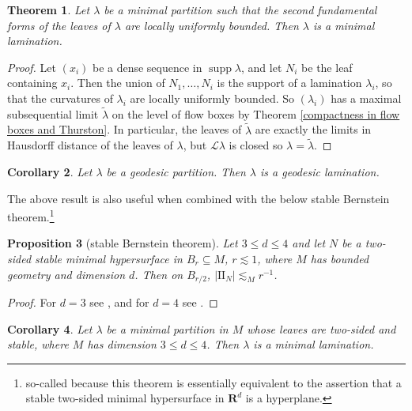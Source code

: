 \documentclass[reqno,11pt]{amsart}
\newcommand{\RR}{\mathbf{R}}
\DeclareMathOperator{\supp}{supp}
\newcommand{\Leaves}{\mathscr L}
\newcommand{\Two}{\mathrm{I\!I}}
\newtheorem{theorem}{Theorem}[section]
\newtheorem{proposition}[theorem]{Proposition}
\newtheorem{corollary}[theorem]{Corollary}
\theoremstyle{definition}
\numberwithin{equation}{section}
\begin{document}
\begin{theorem}\label{partition implies lamination}
Let $\lambda$ be a minimal partition such that the second fundamental forms of the leaves of $\lambda$ are locally uniformly bounded.
Then $\lambda$ is a minimal lamination.
\end{theorem}
\begin{proof}
Let $(x_i)$ be a dense sequence in $\supp \lambda$, and let $N_i$ be the leaf containing $x_i$.
Then the union of $N_1, \dots, N_i$ is the support of a lamination $\lambda_i$, so that the curvatures of $\lambda_i$ are locally uniformly bounded.
So $(\lambda_i)$ has a maximal subsequential limit $\tilde \lambda$ on the level of flow boxes by Theorem \ref{compactness in flow boxes and Thurston}.
In particular, the leaves of $\tilde \lambda$ are exactly the limits in Hausdorff distance of the leaves of $\lambda$, but $\Leaves \lambda$ is closed so $\lambda = \tilde \lambda$.
\end{proof}

\begin{corollary}
Let $\lambda$ be a geodesic partition. Then $\lambda$ is a geodesic lamination.
\end{corollary}

The above result is also useful when combined with the below stable Bernstein theorem.\footnote{so-called because this theorem is essentially equivalent to the assertion that a stable two-sided minimal hypersurface in $\RR^d$ is a hyperplane.}

\begin{proposition}[stable Bernstein theorem]
Let $3 \leq d \leq 4$ and let $N$ be a two-sided stable minimal hypersurface in $B_r \subseteq M$, $r \lesssim 1$, where $M$ has bounded geometry and dimension $d$.
Then on $B_{r/2}$, $|\Two_N| \lesssim_M r^{-1}$.
\end{proposition}
\begin{proof}
For $d = 3$ see \cite[Corollary 2.11]{colding2011course}, and for $d = 4$ see \cite{Chodosh2021}.
\end{proof}

\begin{corollary}
Let $\lambda$ be a minimal partition in $M$ whose leaves are two-sided and stable, where $M$ has dimension $3 \leq d \leq 4$.
Then $\lambda$ is a minimal lamination.
\end{corollary}

\printbibliography
\end{document}
